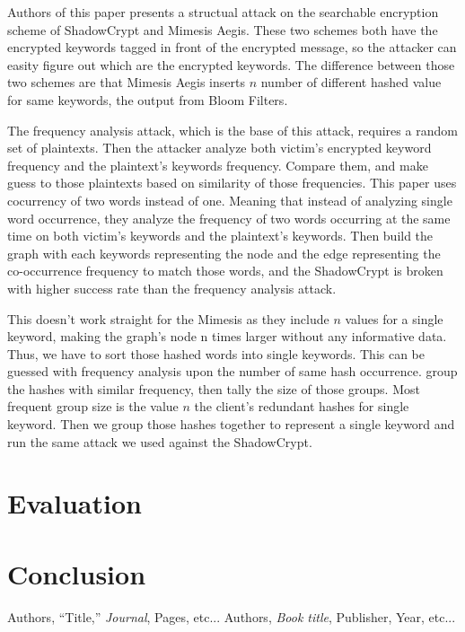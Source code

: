 \documentclass[a4paper]{article}
\begin{document}
Authors of this paper presents a structual attack on the searchable encryption scheme of ShadowCrypt and Mimesis Aegis. These two schemes both have the encrypted keywords tagged in front of the encrypted message, so the attacker can easity figure out which are the encrypted keywords. The difference between those two schemes are that Mimesis Aegis inserts $n$ number of different hashed value for same keywords, the output from Bloom Filters. 
\par The frequency analysis attack, which is the base of this attack, requires a random set of plaintexts. Then the attacker analyze both victim's encrypted keyword frequency and the plaintext's keywords frequency. Compare them, and make guess to those plaintexts based on similarity of those frequencies. This paper uses cocurrency of two words instead of one. Meaning that instead of analyzing single word occurrence, they analyze the frequency of two words occurring at the same time on both victim's keywords and the plaintext's keywords. Then build the graph with each keywords representing the node and the edge representing the co-occurrence frequency to match those words, and the ShadowCrypt is broken with higher success rate than the frequency analysis attack.
\par This doesn't work straight for the Mimesis as they include $n$ values for a single keyword, making the graph's node n times larger without any informative data. Thus, we have to sort those hashed words into single keywords. This can be guessed with frequency analysis upon the number of same hash occurrence. group the hashes with similar frequency, then tally the size of those groups. Most frequent group size is the value $n$ the client's redundant hashes for single keyword. Then we group those hashes together to represent a single keyword and run the same attack we used against the ShadowCrypt.



\section{Evaluation}



\section{Conclusion}

\begin{thebibliography}{9}
Authors, ``Title,'' {\em Journal}, Pages, etc...
Authors, {\em Book title}, Publisher, Year, etc...

\end{thebibliography}
\end{document}
